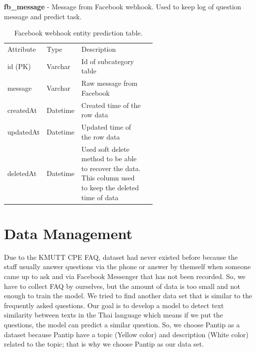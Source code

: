 \documentclass[12pt,oneside,openright,a4paper]{cpe-english-project}
\begin{document}
\textbf{fb\_message} - Message from Facebook webhook. Used to keep log of question message and predict task.
\begin{table}[ht]
	\caption{Facebook webhook entity prediction table.}
	\label{tab:Facebook webhook entity prediction table.}
\begin{adjustbox}{width=\textwidth}
\begin{tabular}{llp{0.6\linewidth}l}
\rowcolor[HTML]{5B9BD5} 
Attribute & Type     & Description                                                                                                 \\
\rowcolor[HTML]{DEEAF6} 
id (PK)   & Varchar  & Id of subcategory table                                                                                     \\
message   & Varchar  & Raw message from Facebook                                                                                   \\
\rowcolor[HTML]{DEEAF6} 
createdAt & Datetime & Created time of the row data                                                                                \\
updatedAt & Datetime & Updated time of the row   data                                                                              \\
\rowcolor[HTML]{DEEAF6} 
deletedAt & Datetime & Used soft delete method to be able to recover the data. This column   used to keep the deleted time of data
\end{tabular}
\end{adjustbox}
\end{table}

\pagebreak

\section{Data Management}
Due to the KMUTT CPE FAQ, dataset had never existed before because the staff usually answer questions via the phone or answer by themself when someone came up to ask and via Facebook Messenger that has not been recorded. So, we have to collect FAQ by ourselves, but the amount of data is too small and not enough to train the model. We tried to find another data set that is similar to the frequently asked questions. Our goal is to develop a model to detect text similarity between texts in the Thai language which means if we put the questions, the model can predict a similar question. So, we choose Pantip as a dataset because Pantip have a topic (Yellow color) and description (White color) related to the topic; that is why we choose Pantip as our data set.
\end{document}
